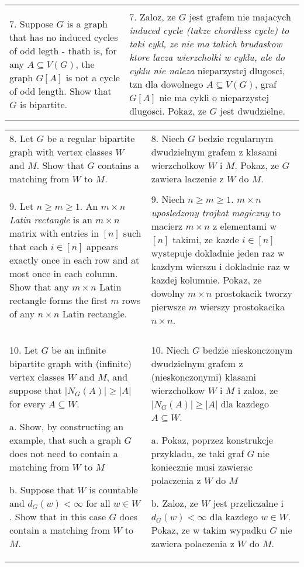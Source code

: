 \documentclass{article}[13pt]
\begin{document}
\begin{tabularx}{\textwidth}{ X X }
         & \\

        7. Suppose $G$ is a graph that has no induced cycles of odd legth - thath is, for any $A\subseteq V(G)$, the graph $G[A]$ is not a cycle of odd length. Show that $G$ is bipartite. & 7. Zaloz, ze $G$ jest grafem nie majacych \emph{induced cycle (takze chordless cycle) to taki cykl, ze nie ma takich brudaskow ktore lacza wierzcholki w cyklu, ale do cyklu nie naleza} nieparzystej dlugosci, tzn dla dowolnego $A\subseteq V(G)$, graf $G[A]$ nie ma cykli o nieparzystej dlugosci. Pokaz, ze $G$ jest dwudzielne.
    \end{tabularx}

    \begin{tabularx}{\textwidth}{ X X }
        8. Let $G$ be a regular bipartite graph with vertex classes $W$ and $M$. Show that $G$ contains a matching from $W$ to $M$. & 8. Niech $G$ bedzie regularnym dwudzielnym grafem z klasami wierzcholkow $W$ i $M$. Pokaz, ze $G$ zawiera laczenie z $W$ do $M$.\\

         & \\
        
        9. Let $n\geq m\geq1$. An $m\times n$ \emph{Latin rectangle} is an $m\times n$ matrix with entries in $[n]$ such that each $i\in[n]$ appears exactly once in each row and at most once in each column. Show that any $m\times n$ Latin rectangle forms the first $m$ rows of any $n\times n$ Latin rectangle. & 9. Niech $n\geq m\geq1$. $m\times n$ \emph{uposledzony trojkat magiczny} to macierz $m\times n$ z elementami w $[n]$ takimi, ze kazde $i\in [n]$ wystepuje dokladnie jeden raz w kazdym wierszu i dokladnie raz w kazdej kolumnie. Pokaz, ze dowolny $m\times n$ prostokacik tworzy pierwsze $m$ wierszy prostokacika $n\times n$.\\

        & \\

        10. Let $G$ be an infinite bipartite graph with (infinite) vertex classes $W$ and $M$, and suppose that $|N_G(A)|\geq|A|$ for every $A\subseteq W$.

        a. Show, by constructing an example, that such a graph $G$ does not need to contain a matching from $W$ to $M$

        b. Suppose that $W$ is countable and $d_G(w)<\infty$ for all $w\in W$. Show that in this case $G$ does contain a matching from $W$ to $M$. & 10. Niech $G$ bedzie nieskonczonym dwudzielnym grafem z (nieskonczonymi) klasami wierzcholkow $W$ i $M$ i zaloz, ze $|N_G(A)|\geq|A|$ dla kazdego $A\subseteq W$.

        a. Pokaz, poprzez konstrukcje przykladu, ze taki graf $G$ nie koniecznie musi zawierac polaczenia z $W$ do $M$

        b. Zaloz, ze $W$ jest przeliczalne i $d_G(w)<\infty$ dla kazdego $w\in W$. Pokaz, ze w takim wypadku $G$ nie zawiera polaczenia z $W$ do $M$.

    \end{tabularx}
\end{document}
